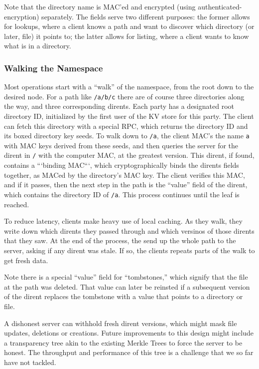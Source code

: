 Note that the directory name is MAC'ed and encrypted (using authenticated-encryption) separately.
The fields serve two different purposes: the former allows for lookups, where a client knows
a path and want to discover which directory (or later, file) it points to; the latter allows
for listing, where a client wants to know what is in a directory.

\subsubsection{Walking the Namespace}
\label{sec:walk}

Most operations start with a ``walk'' of the namespace, from the root down to the desired node.
For a path like \texttt{/a/b/c} there are of course three directories along the way,
and three corresponding dirents.  Each party has a designated root directory ID, initialized
by the first user of the KV store for this party. The client can fetch this directory 
with a special RPC, which returns the directory ID and its boxed directory key seeds.
To walk down to \texttt{/a}, the client MAC's the name \texttt{a} with MAC keys 
derived from these seeds, and then queries the server for the dirent in \texttt{/}
with the computer MAC, at the greatest version. This dirent, if found, contains a
```binding MAC```, which cryptographically binds the dirents fields together, as MACed
by the directory's MAC key. The client verifies this MAC, and if it passes, then the next
step in the path is the ``value'' field of the dirent, which contains the directory ID
of \texttt{/a}. This process continues until the leaf is reached.

To reduce latency, clients make heavy use of local caching. As they walk, they write down
which dirents they passed through and which versinos of those dirents that they saw.
At the end of the process, the send up the whole path to the server, asking if any dirent
was stale. If so, the clients repeats parts of the walk to get fresh data. 

Note there is a special ``value'' field for ``tombstones,'' which signify that the 
file at the path was deleted. That value can later be reinsted if a subsequent version
of the dirent replaces the tombstone with a value that points to a directory or file.

A dishonest server can withhold fresh dirent versions, which might mask file
updates, deletions or creations. Future improvements to this design might
include a transparency tree akin to the existing Merkle Trees to force the
server to be honest. The throughput and performance of this tree is a challenge
that we so far have not tackled.

